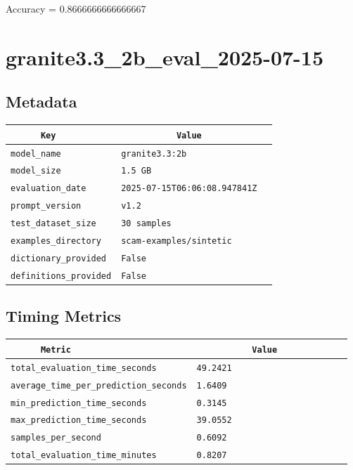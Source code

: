 \documentclass{article}
\begin{document}
\begin{center}
Accuracy = 0.8666666666666667
\end{center}

\section{granite3.3\_2b\_eval\_2025-07-15}
\subsection{Metadata}

\begin{center}
\begin{tabular}{l | l} \hline
    \verb|      Key      | & \verb|           Value           | \\ \hline
    \hline
    \verb|model_name    | & \verb|granite3.3:2b                | \\ \hline
    \verb|model_size    | & \verb|1.5 GB                       | \\ \hline
    \verb|evaluation_date| & \verb|2025-07-15T06:06:08.947841Z  | \\ \hline
    \verb|prompt_version| & \verb|v1.2                         | \\ \hline
    \verb|test_dataset_size| & \verb|30 samples                   | \\ \hline
    \verb|examples_directory| & \verb|scam-examples/sintetic       | \\ \hline
    \verb|dictionary_provided| & \verb|False                        | \\ \hline
    \verb|definitions_provided| & \verb|False                        | \\ \hline
\end{tabular}
\end{center}

\subsection{Timing Metrics}

\begin{center}
\begin{tabular}{l | l} \hline
    \verb|      Metric     | & \verb|           Value           | \\ \hline
    \hline
    \verb|total_evaluation_time_seconds| & \verb|49.2421                      | \\ \hline
    \verb|average_time_per_prediction_seconds| & \verb|1.6409                       | \\ \hline
    \verb|min_prediction_time_seconds| & \verb|0.3145                       | \\ \hline
    \verb|max_prediction_time_seconds| & \verb|39.0552                      | \\ \hline
    \verb|samples_per_second| & \verb|0.6092                       | \\ \hline
    \verb|total_evaluation_time_minutes| & \verb|0.8207                       | \\ \hline
\end{tabular}
\end{center}
\end{document}
